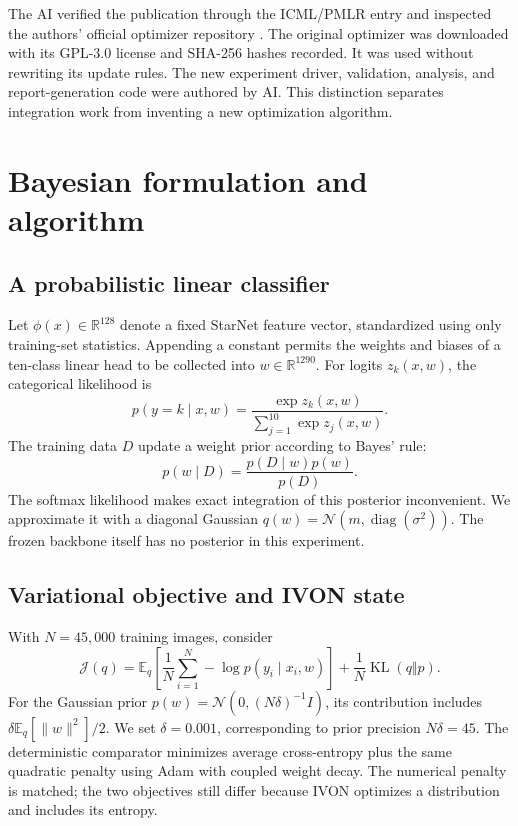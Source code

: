 \documentclass[11pt,a4paper]{article}
\newcommand{\E}{\mathbb{E}}
\begin{document}
The AI verified the publication through the ICML/PMLR entry and inspected the
authors' official optimizer repository \cite{ivoncode}. The original optimizer
was downloaded with its GPL-3.0 license and SHA-256 hashes recorded. It was used
without rewriting its update rules. The new experiment driver, validation,
analysis, and report-generation code were authored by AI. This distinction
separates integration work from inventing a new optimization algorithm.

\section{Bayesian formulation and algorithm}
\subsection{A probabilistic linear classifier}
Let $\phi(x)\in\mathbb{R}^{128}$ denote a fixed StarNet feature vector, standardized
using only training-set statistics. Appending a constant permits the weights and
biases of a ten-class linear head to be collected into $w\in\mathbb{R}^{1290}$.
For logits $z_k(x,w)$, the categorical likelihood is
\begin{equation}
 p(y=k\mid x,w)=\frac{\exp z_k(x,w)}{\sum_{j=1}^{10}\exp z_j(x,w)}.
\end{equation}
The training data $D$ update a weight prior according to Bayes' rule:
\begin{equation}
 p(w\mid D)=\frac{p(D\mid w)p(w)}{p(D)}.
\end{equation}
The softmax likelihood makes exact integration of this posterior inconvenient.
We approximate it with a diagonal Gaussian $q(w)=\mathcal{N}(m,\operatorname{diag}
(\sigma^2))$. The frozen backbone itself has no posterior in this experiment.

\subsection{Variational objective and IVON state}
With $N=45{,}000$ training images, consider
\begin{equation}\label{eq:objective}
 \mathcal{J}(q)=\E_q\left[\frac{1}{N}\sum_{i=1}^N
 -\log p(y_i\mid x_i,w)\right]+\frac{1}{N}\operatorname{KL}(q\Vert p).
\end{equation}
For the Gaussian prior $p(w)=\mathcal{N}(0,(N\delta)^{-1}I)$, its contribution
includes $\delta\E_q[\|w\|^2]/2$. We set $\delta=0.001$, corresponding to
prior precision $N\delta=45$. The deterministic comparator minimizes average
cross-entropy plus the same quadratic penalty using Adam with coupled weight
decay. The numerical penalty is matched; the two objectives still differ because
IVON optimizes a distribution and includes its entropy.
\end{document}
